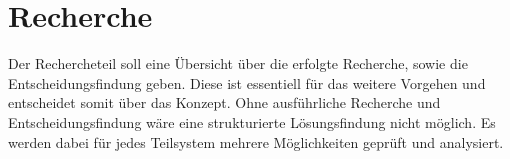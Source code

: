 \section{Recherche}\label{subsec:Recherche}

Der Rechercheteil soll eine Übersicht über die erfolgte Recherche, sowie die Entscheidungsfindung geben. Diese ist essentiell für das weitere Vorgehen und entscheidet somit über das Konzept. Ohne ausführliche Recherche und Entscheidungsfindung wäre eine strukturierte Lösungsfindung nicht möglich. Es werden dabei für jedes Teilsystem mehrere Möglichkeiten geprüft und analysiert.